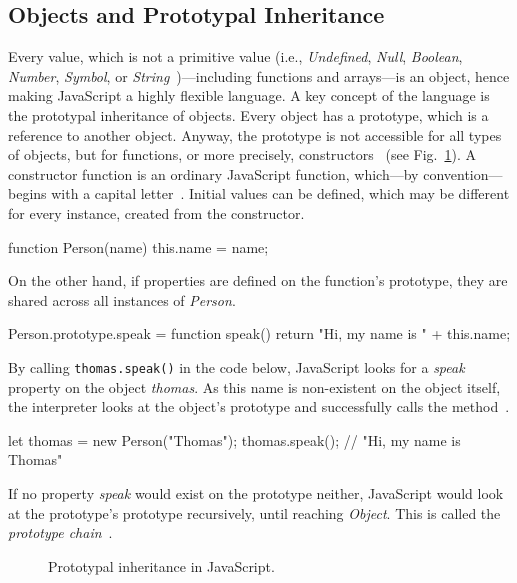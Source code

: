 \subsection{Objects and Prototypal Inheritance}
\label{sec:objects-prototypal-inheritance}

Every value, which is not a primitive value (i.e., \emph{Undefined}, \emph{Null}, \emph{Boolean}, \emph{Number}, \emph{Symbol}, or \emph{String}~\cite[p.~5]{ES6Spec:Ecma:2015})---including functions and arrays---is an object, hence making JavaScript a highly flexible language. A key concept of the language is the prototypal inheritance of objects. Every object has a prototype, which is a reference to another object. Anyway, the prototype is not accessible for all types of objects, but for functions, or more precisely, constructors~\cite[p.~3]{ES6Spec:Ecma:2015} (see Fig.~\ref{fig:prototypal-inheritance}).
A constructor function is an ordinary JavaScript function, which---by convention---begins with a capital letter~\cite[p.~8]{JavaScriptObjectProgramming:Rinehart:2015}. Initial values can be defined, which may be different for every instance, created from the constructor.
\begin{JsCode}[numbers=none]
function Person(name) {
  this.name = name;
}
\end{JsCode}
On the other hand, if properties are defined on the function's prototype, they are shared across all instances of \emph{Person}.
\begin{JsCode}[numbers=none]
Person.prototype.speak = function speak() {
  return "Hi, my name is " + this.name;
}
\end{JsCode}
By calling \texttt{thomas.speak()} in the code below, JavaScript looks for a \emph{speak} property on the object \emph{thomas}. As this name is non-existent on the object itself, the interpreter looks at the object's prototype and successfully calls the method~\cite[pp.~85--86]{YDKJS:ThisAndObjectPrototypes:Simpson:2015}.
\begin{JsCode}[numbers=none]
let thomas = new Person("Thomas");
thomas.speak(); // "Hi, my name is Thomas"
\end{JsCode}
If no property \emph{speak} would exist on the prototype neither, JavaScript would look at the prototype's prototype recursively, until reaching \emph{Object}. This is called the \emph{prototype chain}~\cite[p.~86]{YDKJS:ThisAndObjectPrototypes:Simpson:2015}.

\begin{figure}
\centering

\caption{Prototypal inheritance in JavaScript.}
\label{fig:prototypal-inheritance}
\end{figure}

